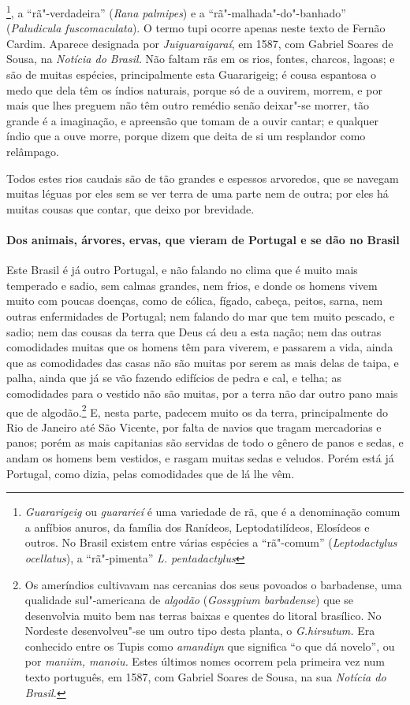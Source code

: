 \footnote{ \textit{Guararigeig} ou
\textit{guararieí} é uma variedade de rã, que é a denominação comum a
anfíbios anuros, da família dos Ranídeos, Leptodatilídeos, Elosídeos e
outros. No Brasil existem entre várias espécies a ``rã"-comum''
(\textit{Leptodactylus ocellatus}), a ``rã"-pimenta'' \textit{L. pentadactylus}}, 
a ``rã"-verdadeira'' (\textit{Rana palmipes}) e a
``rã"-malhada"-do"-banhado'' (\textit{Paludicula fuscomaculata}). O termo
tupi ocorre apenas neste texto de Fernão Cardim. Aparece designada por
\textit{Juiguaraigaraí}, em 1587, com Gabriel Soares de Sousa, na
\textit{Notícia do Brasil.} Não faltam rãs em os rios,
fontes, charcos, lagoas; e são de muitas espécies, principalmente esta
Guararigeig; é cousa espantosa o medo que dela têm os índios
naturais, porque só de a ouvirem, morrem, e por mais que lhes preguem
não têm outro remédio senão deixar"-se morrer, tão grande é a
imaginação, e apreensão que tomam de a ouvir cantar; e qualquer índio
que a ouve morre, porque dizem que deita de si um resplandor como relâmpago.

 Todos estes rios caudais são de tão grandes e espessos arvoredos, que
se navegam muitas léguas por eles sem se ver terra de uma parte nem de
outra; por eles há muitas cousas que contar, que deixo por brevidade. 


\paragraph{Dos animais, árvores, ervas, que vieram de Portugal e se dão no Brasil}

 Este Brasil é já outro Portugal, e não falando no clima que é muito
mais temperado e sadio, sem calmas grandes, nem frios, e donde os
homens vivem muito com poucas doenças, como de cólica, fígado, cabeça,
peitos, sarna, nem outras enfermidades de Portugal; nem falando do mar
que tem muito pescado, e sadio; nem das cousas da terra que Deus cá deu
a esta nação; nem das outras comodidades muitas que os homens têm para
viverem, e passarem a vida, ainda que as comodidades das casas não são
muitas por serem as mais delas de taipa, e palha, ainda que já se vão
fazendo edifícios de pedra e cal, e telha; as comodidades para o
vestido não são muitas, por a terra não dar outro pano mais que de
algodão.\footnote{ Os ameríndios cultivavam nas cercanias dos seus
povoados o barbadense, uma qualidade sul"-americana de \textit{algodão}
(\textit{Gossypium barbadense}) que se desenvolvia muito bem nas terras baixas
e quentes do litoral brasílico. No Nordeste desenvolveu"-se um outro
tipo desta planta, o \textit{G.hirsutum.} Era conhecido entre os Tupis
como \textit{amandiyn} que significa ``o que dá novelo'', ou por
\textit{maniim, manoiu.} Estes últimos nomes ocorrem pela primeira vez
num texto português, em 1587, com Gabriel Soares de Sousa, na sua
\textit{Notícia do Brasil.}} E, nesta parte, padecem muito os da terra,
principalmente do Rio de Janeiro até São Vicente, por falta de navios
que tragam mercadorias e panos; porém as mais capitanias são servidas
de todo o gênero de panos e sedas, e andam os homens bem vestidos, e
rasgam muitas sedas e veludos. Porém está já Portugal, como dizia,
pelas comodidades que de lá lhe vêm.

